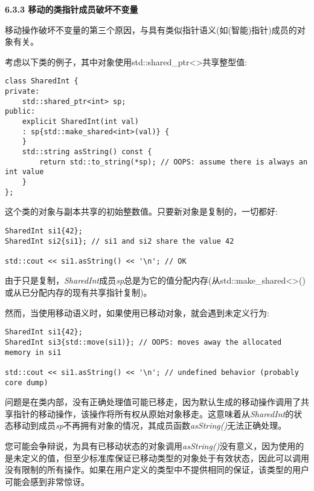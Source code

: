 \hspace*{\fill} \par %
\textbf{6.3.3 移动的类指针成员破坏不变量}

移动操作破坏不变量的第三个原因，与具有类似指针语义(如(智能)指针)成员的对象有关。\par

考虑以下类的例子，其中对象使用std::shared\_ptr<>共享整型值:\par

\begin{lstlisting}[caption={}]
class SharedInt {
private:
	std::shared_ptr<int> sp;
public:
	explicit SharedInt(int val)
	: sp{std::make_shared<int>(val)} {
	}
	std::string asString() const {
		return std::to_string(*sp); // OOPS: assume there is always an int value
	}
};
\end{lstlisting}

这个类的对象与副本共享的初始整数值。只要新对象是复制的，一切都好:\par

\begin{lstlisting}[caption={}]
SharedInt si1{42};
SharedInt si2{si1}; // si1 and si2 share the value 42

std::cout << si1.asString() << '\n'; // OK
\end{lstlisting}

由于只是复制，\textit{SharedInt}成员\textit{sp}总是为它的值分配内存(从std::make\_shared<>()或从已分配内存的现有共享指针复制)。\par

然而，当使用移动语义时，如果使用已移动对象，就会遇到未定义行为:\par

\begin{lstlisting}[caption={}]
SharedInt si1{42};
SharedInt si3{std::move(si1)}; // OOPS: moves away the allocated memory in si1

std::cout << si1.asString() << '\n'; // undefined behavior (probably core dump)
\end{lstlisting}

问题是在类内部，没有正确处理值可能已移走，因为默认生成的移动操作调用了共享指针的移动操作，该操作将所有权从原始对象移走。这意味着从\textit{SharedInt}的状态移动到成员\textit{sp}不再拥有对象的情况，其成员函数\textit{asString()}无法正确处理。\par

您可能会争辩说，为具有已移动状态的对象调用\textit{asString()}没有意义，因为使用的是未定义的值，但至少标准库保证已移动类型的对象处于有效状态，因此可以调用没有限制的所有操作。如果在用户定义的类型中不提供相同的保证，该类型的用户可能会感到非常惊讶。\par

